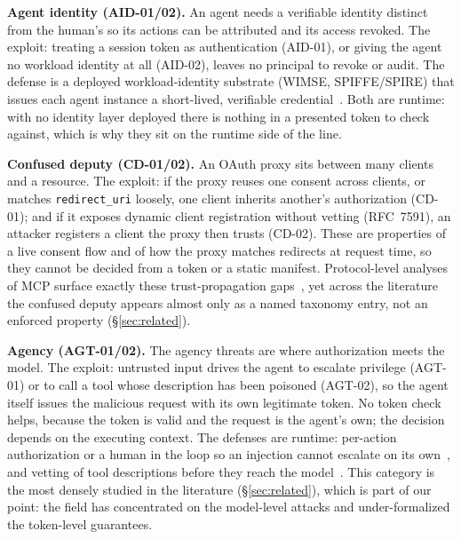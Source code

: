 \noindent\textbf{Agent identity (AID-01/02).} An agent needs a verifiable identity
distinct from the human's so its actions can be attributed and its access revoked.
The exploit: treating a session token as authentication (AID-01), or giving the agent
no workload identity at all (AID-02), leaves no principal to revoke or audit. The
defense is a deployed workload-identity substrate (WIMSE, SPIFFE/SPIRE) that issues
each agent instance a short-lived, verifiable
credential~\cite{agentauth2026aiidentity,agentauth2026ehv,agentauth2025saga}. Both
are runtime: with no identity layer deployed there is nothing in a presented token to
check against, which is why they sit on the runtime side of the line.

\noindent\textbf{Confused deputy (CD-01/02).} An OAuth proxy sits between many clients
and a resource. The exploit: if the proxy reuses one consent across clients, or
matches \texttt{redirect\_uri} loosely, one client inherits another's authorization
(CD-01); and if it exposes dynamic client registration without vetting (RFC~7591), an
attacker registers a client the proxy then trusts (CD-02). These are properties of a
live consent flow and of how the proxy matches redirects at request time, so they
cannot be decided from a token or a static manifest. Protocol-level analyses of MCP
surface exactly these trust-propagation
gaps~\cite{agentauth2026breakingprotocol,agentauth2025gluecode}, yet across the
literature the confused deputy appears almost only as a named taxonomy entry, not an
enforced property (\S\ref{sec:related}).

\noindent\textbf{Agency (AGT-01/02).} The agency threats are where authorization
meets the model. The exploit: untrusted input drives the agent to escalate privilege
(AGT-01) or to call a tool whose description has been poisoned (AGT-02), so the agent
itself issues the malicious request with its own legitimate token. No token check
helps, because the token is valid and the request is the agent's own; the decision
depends on the executing context. The defenses are runtime: per-action authorization
or a human in the loop so an injection cannot escalate on its
own~\cite{agentauth2025progent}, and vetting of tool descriptions before they reach
the model~\cite{agentauth2026trustdesc,agentauth2026unicodetag}. This category is the
most densely studied in the literature (\S\ref{sec:related}), which is part of our
point: the field has concentrated on the model-level attacks and under-formalized the
token-level guarantees.

